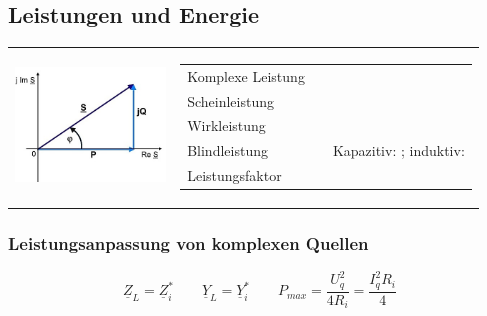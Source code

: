 \subsection{Leistungen und Energie}
	\begin{tabular}{ll}
   		\parbox{4cm}{
   			\includegraphics[width=4cm]{./images/zeigerdiag-leistungen.png}}
   		& \parbox{14cm}{
			\begin{tabular}{p{3cm}p{4.5cm}p{5.5cm}}
	      		\multirow{2}{4cm}{Komplexe Leistung}  &
	      			$ \underline{S} = P + jQ$  &\\
	      			& \multicolumn{2}{l}{$ \underline{S} = \underline{U} \cdot \underline{I}^\ast = U\cdot I \cdot e^{j(\varphi_u-\varphi_i)} = \frac{U^2}{\underline{Z}^*} = I^2 \cdot \underline{Z} = U^2\cdot\underline{Y}^*$}\\
				Scheinleistung
					& $ S = | \underline{S} | = U I = \frac{U^2}{Z} = I^2 Z$ 
					& \\
				Wirkleistung
					& $ P = \Real(\underline{S}) = U I \cos(\varphi) $ \\
				Blindleistung 
					& $ Q = \Imag(\underline{S}) = U I \sin(\varphi) $
					& Kapazitiv: $Q < 0$; induktiv: $Q > 0$ \\
				Leistungsfaktor
					& $\cos \varphi = \frac{P}{S} = \frac{P}{UI}$ \\
			\end{tabular}}
   	\end{tabular}
\subsubsection{Leistungsanpassung von komplexen Quellen}
	\begin{equation*}
		\boxed{\underline{Z}_L = \underline{Z}_i^{\ast}} \qquad \underline{Y}_L = \underline{Y}_i^{\ast} \qquad P_{max} = \frac{U_q^2}{4R_i} = \frac{I_q^2 R_i}{4} 
	\end{equation*}   	

